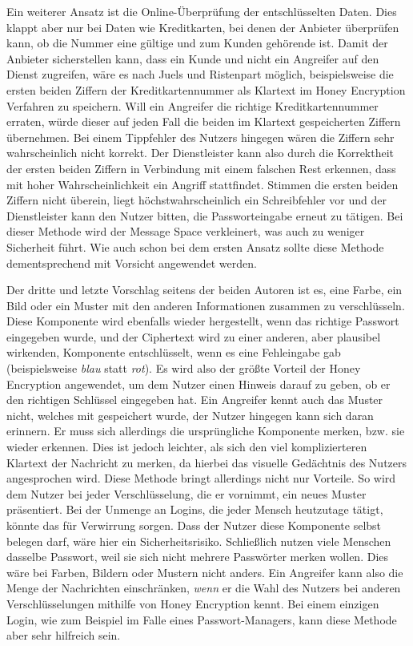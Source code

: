 Ein weiterer Ansatz ist die Online-Überprüfung der entschlüsselten Daten. Dies klappt aber nur bei Daten wie Kreditkarten, bei denen der Anbieter überprüfen kann, ob die Nummer eine gültige und zum Kunden gehörende ist. Damit der Anbieter sicherstellen kann, dass ein Kunde und nicht ein Angreifer auf den Dienst zugreifen, wäre es nach Juels und Ristenpart möglich, beispielsweise die ersten beiden Ziffern der Kreditkartennummer als Klartext im Honey Encryption Verfahren zu speichern. Will ein Angreifer die richtige Kreditkartennummer erraten, würde dieser auf jeden Fall die beiden im Klartext gespeicherten Ziffern übernehmen. Bei einem Tippfehler des Nutzers hingegen wären die Ziffern sehr wahrscheinlich nicht korrekt. Der Dienstleister kann also durch die Korrektheit der ersten beiden Ziffern in Verbindung mit einem falschen Rest erkennen, dass mit hoher Wahrscheinlichkeit ein Angriff stattfindet. Stimmen die ersten beiden Ziffern nicht überein, liegt höchstwahrscheinlich ein Schreibfehler vor und der Dienstleister kann den Nutzer bitten, die Passworteingabe erneut zu tätigen. Bei dieser Methode wird der Message Space verkleinert, was auch zu weniger Sicherheit führt. Wie auch schon bei dem ersten Ansatz sollte diese Methode dementsprechend mit Vorsicht angewendet werden. 

Der dritte und letzte Vorschlag seitens der beiden Autoren ist es, eine Farbe, ein Bild oder ein Muster mit den anderen Informationen zusammen zu verschlüsseln. Diese Komponente wird ebenfalls wieder hergestellt, wenn das richtige Passwort eingegeben wurde, und der Ciphertext wird zu einer anderen, aber plausibel wirkenden, Komponente entschlüsselt, wenn es eine Fehleingabe gab (beispielsweise \emph{blau} statt \emph{rot}). Es wird also der größte Vorteil der Honey Encryption angewendet, um dem Nutzer einen Hinweis darauf zu geben, ob er den richtigen Schlüssel eingegeben hat. Ein Angreifer kennt auch das Muster nicht, welches mit gespeichert wurde, der Nutzer hingegen kann sich daran erinnern. Er muss sich allerdings die ursprüngliche Komponente merken, bzw. sie wieder erkennen. Dies ist jedoch leichter, als sich den viel komplizierteren Klartext der Nachricht zu merken, da hierbei das visuelle Gedächtnis des Nutzers angesprochen wird. Diese Methode bringt allerdings nicht nur Vorteile. So wird dem Nutzer bei jeder Verschlüsselung, die er vornimmt, ein neues Muster präsentiert. Bei der Unmenge an Logins, die jeder Mensch heutzutage tätigt, könnte das für Verwirrung sorgen. Dass der Nutzer diese Komponente selbst belegen darf, wäre hier ein Sicherheitsrisiko. Schließlich nutzen viele Menschen dasselbe Passwort, weil sie sich nicht mehrere Passwörter merken wollen. Dies wäre bei Farben, Bildern oder Mustern nicht anders. Ein Angreifer kann also die Menge der Nachrichten einschränken, \emph{wenn} er die Wahl des Nutzers bei anderen Verschlüsselungen mithilfe von Honey Encryption kennt. Bei einem einzigen Login, wie zum Beispiel im Falle eines Passwort-Managers, kann diese Methode aber sehr hilfreich sein.

